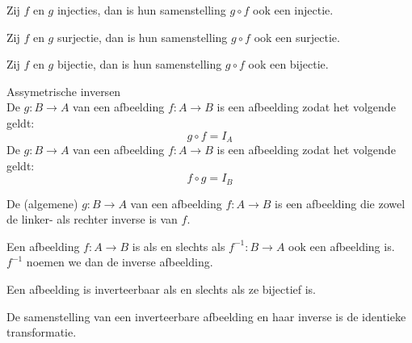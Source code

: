 \documentclass[main.tex]{subfiles}
\begin{document}
\begin{st}
  Zij $f$ en $g$ injecties, dan is hun samenstelling $g \circ f$ ook een injectie.
\end{st}

\begin{st}
  Zij $f$ en $g$ surjectie, dan is hun samenstelling $g \circ f$ ook een surjectie.
\end{st}

\begin{st}
  Zij $f$ en $g$ bijectie, dan is hun samenstelling $g \circ f$ ook een bijectie.
\end{st}

\begin{de}
  Assymetrische inversen\\
  De  $g:B \rightarrow A$ van een afbeelding $f:A \rightarrow B$ is een afbeelding zodat het volgende geldt:
  \[ g \circ f = I_{A} \]
  De  $g:B \rightarrow A$ van een afbeelding $f:A \rightarrow B$ is een afbeelding zodat het volgende geldt:
  \[ f \circ g = I_{B}\]
\end{de}

\begin{de}
  De (algemene)  $g:B \rightarrow A$ van een afbeelding $f:A \rightarrow B$ is een afbeelding die zowel de linker- als rechter inverse is van $f$.
\end{de}

\begin{de}
  Een afbeelding $f: A \rightarrow B$ is  als en slechts als $f^{-1}: B \rightarrow A$ ook een afbeelding is. $f^{-1}$ noemen we dan de inverse afbeelding.
\end{de}

\begin{st}
  \label{st:afb-inverse-asa-bijectief}
  Een afbeelding is inverteerbaar als en slechts als ze bijectief is.
\end{st}

\begin{st}
  \label{st:afb+inverse=identieke}
  De samenstelling van een inverteerbare afbeelding en haar inverse is de identieke transformatie.
\end{st}
\end{document}
